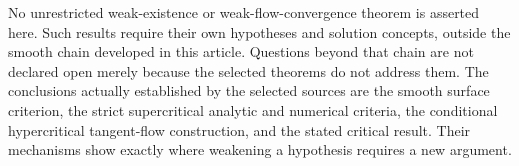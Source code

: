 \documentclass[12pt,reqno]{amsart}
\begin{document}
No unrestricted weak-existence or weak-flow-convergence theorem is asserted here. Such results require their own hypotheses and solution concepts, outside the smooth chain developed in this article. Questions beyond that chain are not declared open merely because the selected theorems do not address them. The conclusions actually established by the selected sources are the smooth surface criterion, the strict supercritical analytic and numerical criteria, the conditional hypercritical tangent-flow construction, and the stated critical result. Their mechanisms show exactly where weakening a hypothesis requires a new argument.


\end{document}
